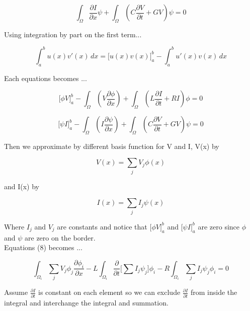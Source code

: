 \documentclass[12pt, letterpaper]{article}
\begin{document}
\begin{equation}
\int_\Omega\frac{\partial{I}}{\partial{x}} \psi
+ \int_\Omega(C \frac{\partial{V}}{\partial{t}} +  G V) \psi
= 0
\end{equation}

Using integration by part on the first term...

\begin{equation}\int_a^b u(x) v'(x) \, dx = \Big[u(x) v(x)\Big]_a^b - \int_a^b u'(x) v(x) \, dx\end{equation}

Each equations becomes ...

\begin{equation}
\Big[\phi V \Big]_a^b
-\int_\Omega(V \frac{\partial{\phi}}{\partial{x}})
+ \int_\Omega(L \frac{\partial{I}}{\partial{t}} +  R I) \phi
= 0
\end{equation}

\begin{equation}\Big[\psi I \Big]_a^b
-\int_\Omega(I \frac{\partial{\psi}}{\partial{x}})
+ \int_\Omega(C \frac{\partial{V}}{\partial{t}} +  G V) \psi
= 0
\end{equation}

Then we approximate by different basis function for V and I, V(x) by

\begin{equation}V(x) = \sum_j V_j \phi(x) \end{equation}

and I(x) by 

\begin{equation}I(x) = \sum_j I_j \psi(x) \end{equation}

Where $I_j$ and $V_j$ are constants and notice that $\Big[\phi V \Big]_a^b$ and $\Big[\psi I \Big]_a^b$ are zero since $\phi$ and $\psi$ are zero on the border.\\

Equations (8) becomes ...

\begin{equation}
	\int_{\Omega_i} \sum_j V_j \phi_j \frac{\partial{\phi_i}}{\partial{x}} 
	- L \int_{\Omega_i} \frac{\partial{}}{\partial t} \Big[ \sum{I_j} \psi_j \Big] \phi_i
	-  R \int_{\Omega_i} \sum_j I_j \psi_j \phi_i
	= 0
\end{equation}

Assume $\frac{\partial{I}}{\partial{t}}$ is constant on each element so we can exclude $\frac{\partial{I}}{\partial{t}}$ from inside the integral and interchange the integral and summation.
\end{document}
